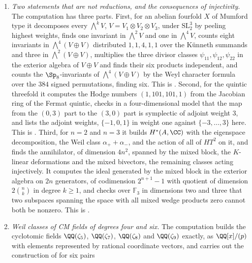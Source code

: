 \begin{enumerate}[label=\textup{(\Roman*)},leftmargin=*]
  excludes them as they stand; and, as a control, that no Koszul resolution
  of a complete intersection, twisted by any $b\in[-6,12]$, is secant for
  $d<30$, which is  in that range.
\item \emph{Two statements that are not reductions, and the consequences of
  injectivity.} The computation has three parts. First, for an abelian
  fourfold $X$ of Mumford type it decomposes every $\bigwedge^{k}V$,
  $V=V_{1}\otimes V_{2}\otimes V_{3}$, under
  $\mathrm{SL}_{2}^{3}$ by peeling highest weights, finds one invariant in
  $\bigwedge^{2}V$ and one in $\bigwedge^{4}V$, counts eight invariants in
  $\bigwedge^{4}(V\oplus V)$ distributed $1,1,4,1,1$ over the K\"unneth
  summands and three in $\bigwedge^{2}(V\oplus V)$, multiplies the three
  divisor classes $\psi_{11},\psi_{12},\psi_{22}$ in the exterior algebra of
  $V\oplus V$ and finds their six products independent, and counts the
  $\Sp_{8}$-invariants of $\bigwedge^{4}(V\oplus V)$ by the Weyl character
  formula over the $384$ signed permutations, finding six. This is
  . Second, for the quintic threefold it computes
  the Hodge numbers $(1,101,101,1)$ from the Jacobian ring of the Fermat
  quintic, checks in a four-dimensional model that the map from the $(0,3)$
  part to the $(3,0)$ part is symplectic of adjoint weight $3$, and lists the
  adjoint weights, $\{-1,0,1\}$ in weight one against $\{-3,\dots,3\}$ here.
  This is . Third, for $n=2$ and $n=3$ it builds
  $H^{*}(A,\CC)$ with the eigenspace decomposition, the Weil class
  $\alpha_{+}+\alpha_{-}$, and the action of all of $HT^{2}$ on it, and finds
  the annihilator, of dimension $4n^{2}$, spanned by the mixed block, the
  $K$-linear deformations and the mixed bivectors, the remaining classes
  acting injectively. It computes the ideal generated by the mixed block in
  the exterior algebra on $2n$ generators, of codimension $2^{n+1}-1$ with
  quotient of dimension $2\binom{n}{k}$ in degree $k\ge1$, and checks over
  $\mathbb{F}_{3}$ in dimensions two and three that two subspaces spanning
  the space with all mixed wedge products zero cannot both be nonzero. This
  is .
\item \emph{Weil classes of CM fields of degrees four and six.} The
  computation builds the cyclotomic fields $\QQ(\zeta_{5})$,
  $\QQ(\zeta_{7})$, $\QQ(\zeta_{8})$ and $\QQ(\zeta_{9})$ exactly, as
  $\QQ[x]/(p)$ with elements represented by rational coordinate vectors, and
  carries out the construction of  for six pairs

\end{enumerate}
